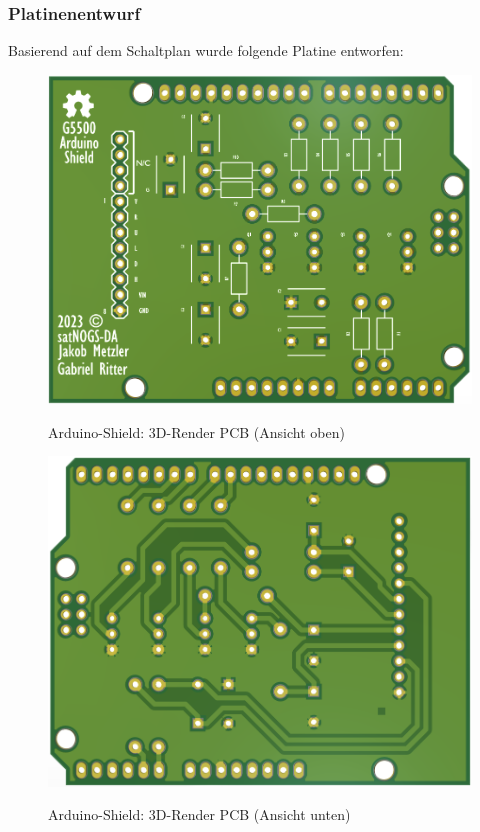 \subsubsection{Platinenentwurf}
\label{subsubsec:platinenentwurf}
Basierend auf dem Schaltplan wurde folgende Platine entworfen:
\begin{figure}[H]
	\begin{minipage}[b]{.4\linewidth} %
		\includegraphics[width=\linewidth]{../ref/PCBArduinoShieldGS232.png}
		\label{fig:PCB_Arduino-Shield_vorne}
		\caption{Arduino-Shield: 3D-Render PCB (Ansicht oben)}
	\end{minipage}
	\hspace{.1\linewidth}%
	\begin{minipage}[b]{.4\linewidth} %
		\includegraphics[width=\linewidth]{../ref/PCBArduinoShieldBackGS232.png}
		\label{fig:PCB_Arduino-Shield_hinten}
		\caption{Arduino-Shield: 3D-Render PCB (Ansicht unten)}
	\end{minipage}
\end{figure}

